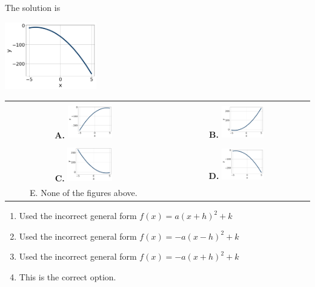 \documentclass{extbook}[14pt]
\begin{document}
 
 The solution is  
 \begin{center} \includegraphics[width=0.3\textwidth]{../Figures/quadraticEquationToGraphDA.png} \end{center}\begin{tabular}{|c|c|} 
\hline 
 & \tabularnewline 
 \textbf{A.} \includegraphics[width=0.3\textwidth]{../Figures/quadraticEquationToGraphAA.png} & \textbf{B.} \includegraphics[width=0.3\textwidth]{../Figures/quadraticEquationToGraphBA.png} \tabularnewline 
\hline 
 & \tabularnewline 
 \textbf{C.} \includegraphics[width=0.3\textwidth]{../Figures/quadraticEquationToGraphCA.png} & \textbf{D.} \includegraphics[width=0.3\textwidth]{../Figures/quadraticEquationToGraphDA.png} \tabularnewline 
\hline 
 E. None of the figures above. & \tabularnewline 
\hline 
 \end{tabular} 
 
\begin{enumerate}[label=\Alph*.] 
\item Used the incorrect general form $f(x) = a(x+h)^2 + k$  
\item Used the incorrect general form $f(x) = -a(x-h)^2 + k$  
\item Used the incorrect general form $f(x) = -a(x+h)^2 + k$  
\item This is the correct option.  
\end{enumerate} 
 
\end{document}
